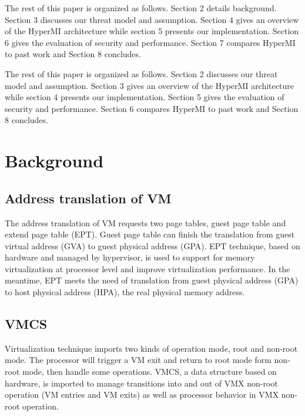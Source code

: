 \documentclass[conference]{IEEEtran}
\begin{document}
The rest of this paper is organized as follows. Section 2 details background. Section 3 discusses our threat model and assumption. Section 4 gives an overview of the HyperMI architecture while section 5 presents our implementation. Section 6 gives the evaluation of security and performance. Section 7 compares HyperMI to past work and Section 8 concludes.

The rest of this paper is organized as follows. Section 2 discusses our threat model and assumption. Section 3 gives an overview of the HyperMI architecture while section 4 presents our implementation. Section 5 gives the evaluation of security and performance. Section 6 compares HyperMI to past work and Section 8 concludes.



\iffalse
\section{Background}
\subsection{Address translation of VM}
The address translation of VM requests two page tables, guest page table and extend page table (EPT). Guest page table can finish the translation from guest virtual address (GVA) to guest physical address (GPA). EPT technique, based on hardware and managed by hypervisor, is used to support for memory virtualization at processor level and improve virtualization performance. In the meantime, EPT meets the need of translation from guest physical address (GPA) to host physical address (HPA), the real physical memory address. 

\subsection{VMCS}
Virtualization technique imports two kinds of operation mode, root and non-root mode. The processor will trigger a VM exit and return to root mode form non-root mode, then handle some operations. VMCS, a data structure based on hardware, is imported to manage transitions into and out of VMX non-root operation (VM entries and VM exits) as well as processor behavior in VMX non-root operation.

\iffalse
\end{document}
